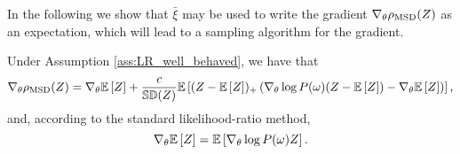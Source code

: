 In the following we show that $\bar{\xi}$ may be used to write the gradient $\nabla_{\theta}{\rho_{\text{MSD}}(Z)}$ as an expectation, which will lead to a sampling algorithm for the gradient.

\begin{proposition}\label{prop:msd_grad_supp}
    Under Assumption \ref{ass:LR_well_behaved}, we have that
\begin{equation*}
    \nabla_{\theta}{\rho_{\text{MSD}}(Z)} = \nabla_{\theta}{\mathbb{E}\left[ Z \right]} + \frac{c}{\mathbb{SD}(Z)}\mathbb{E}\left[ (Z - \mathbb{E}\left[ Z \right])_{+} \left(\nabla_{\theta} \log P(\omega) (Z - \mathbb{E}\left[ Z \right]) - \nabla_{\theta}{\mathbb{E}\left[ Z \right]}\right) \right],
\end{equation*}
and, according to the standard likelihood-ratio method,
\begin{equation*}
    \nabla_{\theta}{\mathbb{E}\left[ Z \right]} = \mathbb{E}\left[ \nabla_{\theta} \log P(\omega) Z \right].
\end{equation*}
\end{proposition}
